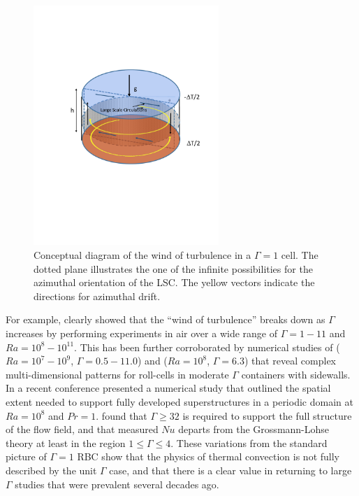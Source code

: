\documentclass[twocolumn,10pt]{tsfp}
\begin{document}
\begin{figure}
\centering
\includegraphics[trim=4cm 9cm 2cm 6cm, clip, width=7cm]{Ar1Sym}
\caption{Conceptual diagram of the wind of turbulence in a $\Gamma=1$ cell. The dotted plane illustrates the one of the infinite possibilities for the azimuthal orientation of the LSC. The yellow vectors indicate the directions for azimuthal drift.}
\label{fig:1ar}
\end{figure}


For example, \cite{dupuits2007breakdown} clearly showed that the ``wind of turbulence'' breaks down as $\Gamma$ increases by performing experiments in air over a wide range of $\Gamma=1-11$ and $Ra=10^8-10^{11}$.
This has been further corroborated by numerical studies of \cite{bailon2010aspect} ($Ra=10^7-10^9$, $\Gamma=0.5-11.0$)  and \cite{sakievich2016large} ($Ra=10^8$, $\Gamma=6.3$) that reveal complex multi-dimensional patterns for roll-cells in moderate $\Gamma$ containers with sidewalls.  
In a recent conference \cite{stevens2016superstructures} presented a numerical study that outlined the spatial extent needed to support fully developed superstructures in a periodic domain at $Ra=10^8$ and $Pr=1$.  
\cite{stevens2016superstructures} found that $\Gamma\geq32$ is required to support the full structure of the flow field, and that measured $Nu$ departs from the Grossmann-Lohse theory at least in the region $1\leq\Gamma\leq4$.  
These variations from the standard picture of $\Gamma=1$ RBC show that the physics of thermal convection is not fully described by the unit $\Gamma$ case, and that there is a clear value in returning to large $\Gamma$ studies that were prevalent several decades ago.
\end{document}
